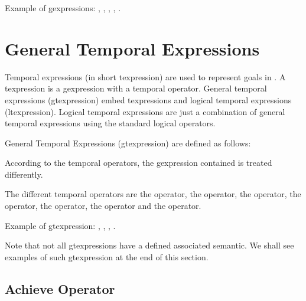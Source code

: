 Example of gexpressions: \*
,\*
,\*
,\*
,\*
.

\section{General Temporal Expressions}


Temporal expressions (in short texpression) are used to represent goals in
\COPRS{}. A texpression is a gexpression with a temporal operator. General
temporal expressions (gtexpression) embed texpressions and logical temporal
expressions (ltexpression). Logical temporal expressions are just a combination
of general temporal expressions using the standard logical operators.

General Temporal Expressions (gtexpression) are defined as follows:

\noindent
{} \*
 \*
 \*
\*
\*
\*

According to the temporal operators, the gexpression contained is treated
differently.

The different temporal operators are the  operator, the 
operator, the  operator, the  operator, the
 operator, the  operator and the
 operator.

Example of gtexpression:\*
,\*
,\*
,\*
.

Note that not all gtexpressions have a defined associated semantic. We
shall see examples of such gtexpression at the end of this section.



\subsection{Achieve Operator}

